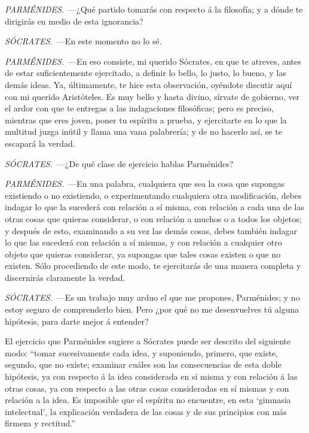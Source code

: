 \documentclass[10pt]{article}
\begin{document}
  \begin{adjustwidth}{1.2cm}{}

    \noindent\emph{PARMÉNIDES.}~---¿Qué partido tomarás con respecto á la filosofía; y a
    dónde te dirigirás en medio de esta ignorancia?

    \noindent\emph{SÓCRATES.}~---En este momento no lo sé.

    \noindent\emph{PARMÉNIDES.}~---En eso consiste, mi querido Sócrates, en que te
    atreves,
    antes de estar suficientemente ejercitado, a definir lo bello, lo justo, lo
    bueno, y las demás ideas. Ya, últimamente, te hice esta observación, oyéndote
    discutir aquí con mi querido Aristóteles. Es muy bello y hasta divino, sírvate
    de gobierno, ver el ardor con que te entregas a las indagaciones filosóficas;
    pero es preciso, mientras que eres joven, poner tu espíritu a prueba, y
    ejercitarte en lo que la multitud juzga inútil y llama una vana palabrería; y de
    no hacerlo así, se te escapará la verdad.

    \noindent\emph{SÓCRATES.}~---¿De qué clase de ejercicio hablas Parménides?

    \noindent[\ldots]

    \noindent\emph{PARMÉNIDES.}~---En una palabra, cualquiera que sea la cosa que
    supongas
    existiendo o no existiendo, o experimentando cualquiera otra modificación, debes
    indagar lo que la sucederá con relación a sí misma, con relación a cada una de
    las otras cosas que quieras considerar, o con relación a muchos o a todos los
    objetos; y después de esto, examinando a su vez las demás cosas, debes también
    indagar lo que las sucederá con relación a sí mismas, y con relación a cualquier
    otro objeto que quieras considerar, ya supongas que tales cosas existen o que no
    existen. Sólo procediendo de este modo, te ejercitarás de una manera completa y
    discernirás claramente la verdad.

    \noindent\emph{SÓCRATES.}~---Es un trabajo muy arduo el que me propones,
    Parménides; y no estoy seguro de comprenderlo bien. Pero ¿por qué no me
    desenvuelves tú alguna hipótesis, para darte mejor á entender?

  \end{adjustwidth}

  El ejercicio que Parménides sugiere a Sócrates puede ser descrito del siguiente
  modo: ``tomar sucesivamente cada idea, y suponiendo, primero, que existe,
  segundo, que no existe; examinar cuáles son las consecuencias de esta doble
  hipótesis, ya con respecto á la idea considerada en sí misma y con relación á
  las otras cosas, ya con respecto a las otras cosas consideradas en sí mismas y
  con relación a la idea. Es imposible que el espíritu no encuentre, en esta
  `gimnasia intelectual', la explicación verdadera de las cosas y de sus
  principios con más firmeza y rectitud.'' 
\end{document}
